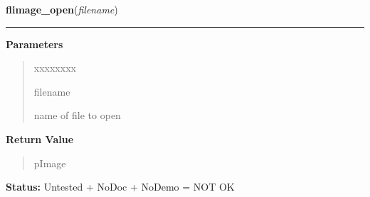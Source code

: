 \hspace{.8\funcindent}\begin{boxedminipage}{\funcwidth}

    \raggedright \textbf{flimage\_open}(\textit{filename})

    \vspace{-1.5ex}

    \rule{\textwidth}{0.5\fboxrule}
\setlength{\parskip}{2ex}
\setlength{\parskip}{1ex}
      \textbf{Parameters}
      \vspace{-1ex}

      \begin{quote}
        \begin{Ventry}{xxxxxxxx}

          \item[filename]

          name of file to open

        \end{Ventry}

      \end{quote}

      \textbf{Return Value}
    \vspace{-1ex}

      \begin{quote}
      pImage

      \end{quote}

\textbf{Status:} Untested + NoDoc + NoDemo = NOT OK



    \end{boxedminipage}

    \label{xformslib:library:flimage_read_annotation}

    \vspace{0.5ex}

